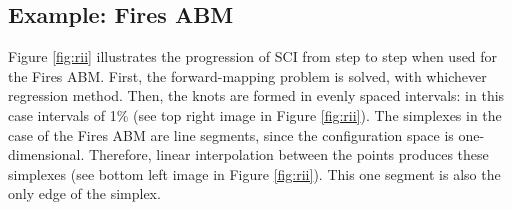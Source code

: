 \subsection{Example: Fires ABM}

Figure \ref{fig:rii} illustrates the progression of SCI from step to step when used for the Fires ABM.
First, the forward-mapping problem is solved, with whichever regression method.
Then, the knots are formed in evenly spaced intervals: in this case intervals of 1\% (see top right image in Figure \ref{fig:rii}).
The simplexes in the case of the Fires ABM are line segments, since the configuration space is one-dimensional.
Therefore, linear interpolation between the points produces these simplexes (see bottom left image in Figure \ref{fig:rii}).
This one segment is also the only edge of the simplex.

